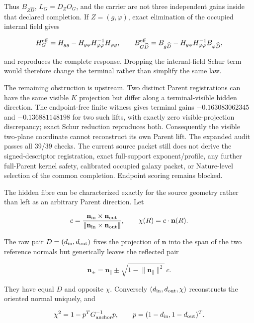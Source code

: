 \documentclass[11pt]{article}
\begin{document}
Thus $B_{Z\widehat D}$, $L_G=D_ZO_G$, and the carrier are not three independent
gains inside that declared completion.  If $Z=(g,\varphi)$, exact
elimination of the occupied internal field gives

\[
H_G^{\rm eff}=H_{gg}-H_{g\varphi}H_{\varphi\varphi}^{-1}H_{\varphi g},
\qquad
B_{G\widehat D}^{\rm eff}=B_{g\widehat D}
-H_{g\varphi}H_{\varphi\varphi}^{-1}B_{\varphi\widehat D},
\]

and reproduces the complete response.  Dropping the internal-field Schur term
would therefore change the terminal rather than simplify the same law.

The remaining obstruction is upstream.  Two distinct Parent registrations
can have the same visible $K$ projection but differ along a terminal-visible
hidden direction.  The endpoint-free finite witness gives terminal gains
$-0.163083062345$ and $-0.136881148198$ for two such lifts, with exactly
zero visible-projection discrepancy; exact Schur reduction reproduces both.
Consequently the visible two-plane coordinate cannot reconstruct its own
Parent lift.  The expanded audit passes all 39/39 checks.  The current
source packet still does not derive the signed-descriptor registration, exact
full-support exponent/profile, any further full-Parent kernel safety, calibrated occupied
galaxy packet, or Nature-level selection of the common completion.  Endpoint
scoring remains blocked.

The hidden fibre can be characterized exactly for the source geometry rather
than left as an arbitrary Parent direction.  Let

\[
c=\frac{\mathbf n_{\rm in}\times\mathbf n_{\rm out}}{
\lVert\mathbf n_{\rm in}\times\mathbf n_{\rm out}\rVert},
\qquad
\chi(R)=c\mathbin{\cdot}\mathbf n(R).
\]

The raw pair $D=(d_{\rm in},d_{\rm out})$ fixes the projection of
$\mathbf n$ into the span of the two reference normals but generically leaves
the reflected pair

\[
\mathbf n_{\pm}=\mathbf n_{\parallel}
\pm\sqrt{1-\lVert\mathbf n_{\parallel}\rVert^2}\,c.
\]

They have equal $D$ and opposite $\chi$.  Conversely
$(d_{\rm in},d_{\rm out},\chi)$ reconstructs the oriented normal uniquely,
and

\[
\chi^2=1-p^TG_{\rm anchor}^{-1}p,
\qquad
p=(1-d_{\rm in},1-d_{\rm out})^T.
\]
\end{document}
